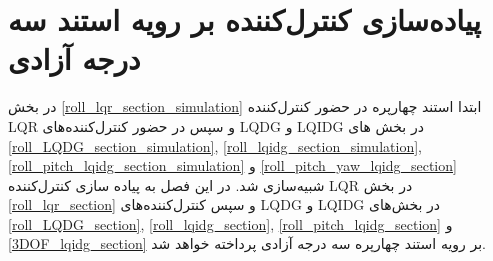 \chapter{پیاده‌سازی کنترل‌کننده بر رویه استند سه درجه آزادی}

 در بخش
\ref{roll_lqr_section_simulation}
ابتدا  استند چهارپره در حضور کنترل‌کننده LQR و سپس در حضور کنترل‌کننده‌های LQDG و LQIDG در بخش های
\ref{roll_LQDG_section_simulation},
\ref{roll_lqidg_section_simulation},
\ref{roll_pitch_lqidg_section_simulation}
و
\ref{roll_pitch_yaw_lqidg_section}
شبیه‌سازی شد.
در این فصل به پیاده سازی کنترل‌کننده LQR در بخش
\ref{roll_lqr_section}
و سپس کنترل‌کننده‌های LQDG و LQIDG در بخش‌های 
\ref{roll_LQDG_section},
\ref{roll_lqidg_section},
\ref{roll_pitch_lqidg_section}
و
\ref{3DOF_lqidg_section}
بر رویه استند چهارپره سه درجه آزادی پرداخته خواهد‌ شد.
